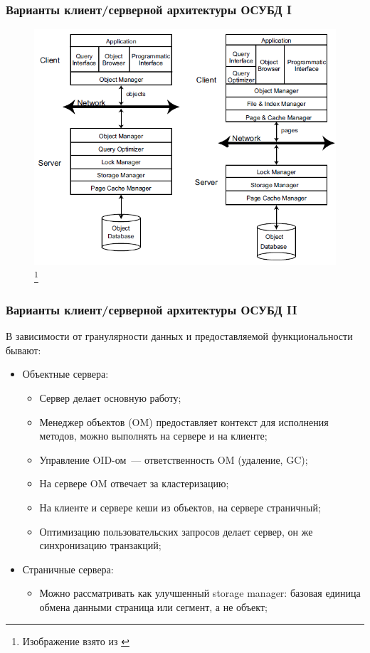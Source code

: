 \documentclass{beamer}
\begin{document}
\begin{frame}[t]
\frametitle{Варианты клиент/серверной архитектуры ОСУБД I}

\begin{figure}[htb]
\includegraphics[width=\textwidth,height=0.77\textheight,keepaspectratio]{architectures.png} 
\footnote{\tiny{Изображение взято из \cite{Ozsu2011}}}
\end{figure}      
\end{frame}

\begin{frame}
\frametitle{Варианты клиент/серверной архитектуры ОСУБД II}

В зависимости от гранулярности данных и предоставляемой функциональности бывают:

\begin{itemize}
  \item Объектные сервера:
  \begin{itemize}
    \item Сервер делает основную работу;
    \item Менеджер объектов (OM) предоставляет контекст для исполнения методов, можно выполнять на сервере и на клиенте;
    \item Управление OID-ом~--- ответственность OM (удаление, GC);
    \item На сервере OM отвечает за кластеризацию;
    \item На клиенте и сервере кеши из объектов, на сервере страничный;
    \item Оптимизацию пользовательских запросов делает сервер, он же синхронизацию транзакций;

  \end{itemize}  
  \item Страничные сервера:
  \begin{itemize}
    \item Можно рассматривать как улучшенный storage manager: базовая единица обмена данными страница или сегмент, а не объект;
  \end{itemize}  

\end{itemize}
\end{frame}
\end{document}
